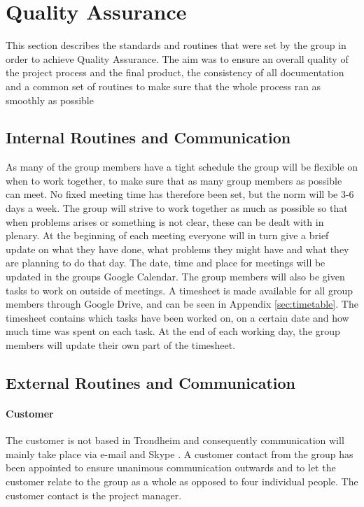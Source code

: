 \section{Quality Assurance}

This section describes the standards and routines that were set by the group in order to achieve Quality Assurance. The aim was to ensure an overall quality of the project process and the final product, the consistency of all documentation and a common set of routines to make sure that the whole process ran as smoothly as possible

\subsection{Internal Routines and Communication}

As many of the group members have a tight schedule the group will be flexible on when to work together, to make sure that as many group members as possible can meet. No fixed meeting time has therefore been set, but the norm will be 3-6 days a week. The group will strive to work together as much as possible so that when problems arises or something is not clear, these can be dealt with in plenary. At the beginning of each meeting everyone will in turn give a brief update on what they have done, what problems they might have and what they are planning to do that day. The date, time and place for meetings will be updated in the groups Google Calendar\cite{googleCalendar}. The group members will also be given tasks to work on outside of meetings. A timesheet is made available for all group members through Google Drive\cite{drive}, and can be seen in Appendix \ref{sec:timetable}. The timesheet contains which tasks have been worked on, on a certain date and how much time was spent on each task. At the end of each working day, the group members will update their own part of the timesheet.

\subsection{External Routines and Communication}

\paragraph{Customer}

The customer is not based in Trondheim and consequently communication will mainly take place via e-mail and Skype
\cite{skype}. A customer contact from the group has been appointed to ensure unanimous communication outwards and to let the customer relate to the group as a whole as opposed to four individual people. The customer contact is the project manager. 

